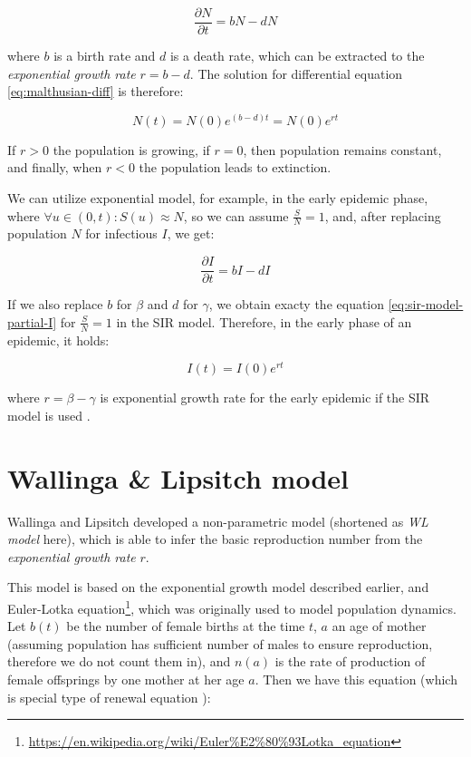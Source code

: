 \documentclass[
  digital, %
  oneside, %
  lof,     %
  lot,     %
]{fithesis4}
\begin{document}
\begin{equation}\label{eq:malthusian-diff}
  \frac{\partial N}{\partial t} = b N - d N
\end{equation}

where $b$ is a birth rate and $d$ is a death rate, which can be extracted to the \textit{exponential growth rate} $r = b - d$.
The solution for differential equation \eqref{eq:malthusian-diff} is therefore:

\begin{equation}
  N(t) = N(0) e^{(b - d)t} = N(0) e^{rt}
\end{equation}

If $r > 0$ the population is growing,
if $r = 0$, then population remains constant, and finally, 
when $r < 0$ the population leads to extinction.

We can utilize exponential model,
for example, in the early epidemic phase,
where $\forall u \in (0, t) : S(u) \approx N$, so we can assume $\frac{S}{N} = 1$,
and, after replacing population $N$ for infectious $I$, we get:

\begin{equation}
  \frac{\partial I}{\partial t} = b I - d I
\end{equation}

If we also replace $b$ for $\beta$ and $d$ for $\gamma$, we
obtain exacty the equation \eqref{eq:sir-model-partial-I} for $\frac{S}{N} = 1$ in the SIR model.
Therefore, in the early phase of an epidemic, it holds:

\begin{equation}
  I(t) = I(0) e^{rt}
\end{equation}

where $r = \beta - \gamma$ is exponential growth rate for the early epidemic
if the SIR model is used \cite{ma2019}.



\section{Wallinga \& Lipsitch model}
\label{sec:wl-model}

Wallinga and Lipsitch \cite{wallinga2007} developed a non-parametric
model (shortened as \textit{WL model} here), which is able to infer
the basic reproduction number from the \textit{exponential growth rate} $r$.

This model is based on the exponential growth model described earlier, and
Euler-Lotka equation\footnote{\url{https://en.wikipedia.org/wiki/Euler\%E2\%80\%93Lotka_equation}},
which was originally used to model population dynamics.
Let $b(t)$ be the number of female births at the time $t$, $a$ an 
age of mother (assuming population has sufficient 
number of males to ensure reproduction, therefore we do not 
count them in), and $n(a)$ is the rate of production of female offsprings 
by one mother at her age $a$. Then we have this equation (which is 
special type of renewal equation \cite{feller1941}):
\end{document}
